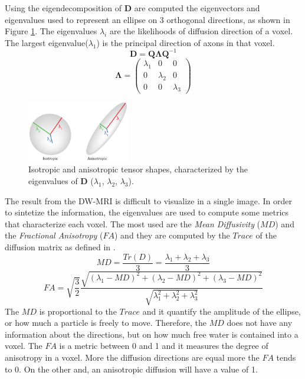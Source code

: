  Using the eigendecomposition of $\mathbf{D}$ are computed the eigenvectors and eigenvalues used to represent an ellipse on 3 orthogonal directions, as shown in Figure \ref{fig:elipse}. The eigenvalues $\lambda_{i}$ are the likelihoods of diffusion direction of a voxel. The largest eigenvalue($\lambda_1$) is the principal direction of axons in that voxel.
 \[\mathbf{D}=\mathbf{Q}\mathbf{\Lambda}\mathbf{Q}^{-1}\]
 \begin{equation}
    \mathbf{\Lambda} = 
    \begin{pmatrix}
        \lambda_{1} & 0 & 0 \\
        0 & \lambda_{2} & 0 \\
        0 & 0 & \lambda_{3}
    \end{pmatrix}
 \end{equation}

 \begin{figure}[h]
    \centering
    \includegraphics[width=0.4\textwidth]{images/ellipses.png}
    \caption{Isotropic and anisotropic tensor shapes, characterized by the eigenvalues of $\mathbf{D}$ ($\lambda_1$, $\lambda_2$, $\lambda_3$). \cite{ellipsoidDTI}}
    \label{fig:elipse}
 \end{figure}

 The result from the DW-MRI is difficult to visualize in a single image. In order to sintetize the information, the eigenvalues are used to compute some metrics that characterize each voxel. The most used are the \emph{Mean Diffusivity} ($MD$) and the \emph{Fractional Anisotropy} ($FA$) and they are computed by the $Trace$ of the diffusion matrix as defined in \cite{dtiBook}.
 \begin{equation}
    {MD} = \frac{{Tr}(D)}{3} = \frac{\lambda_1 + \lambda_2 + \lambda_3}{3}
 \end{equation}
 \begin{equation}
    FA = \sqrt{\frac{3}{2}}\frac{\sqrt{(\lambda_1-MD)^2+(\lambda_2-MD)^2+(\lambda_3-MD)^2}}{\sqrt{\lambda_1^2+\lambda_2^2+\lambda_3^2}}
 \end{equation}
 The $MD$ is proportional to the $Trace$ and it quantify the amplitude of the ellipse, or how much a particle is freely to move. Therefore, the $MD$ does not have any information about the directions, but on how much free water is contained into a voxel. The $FA$ is a metric between 0 and 1 and it measures the degree of anisotropy in a voxel. More the diffusion directions are equal more the $FA$ tends to 0. On the other and, an anisotropic diffusion will have a value of 1.
 
